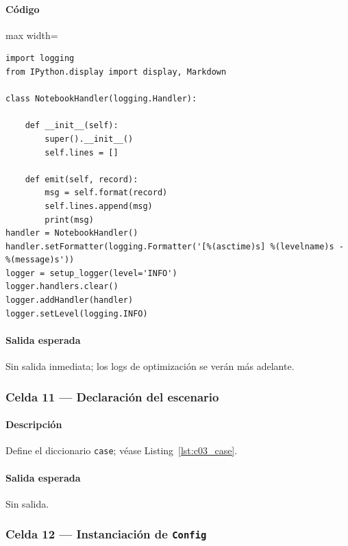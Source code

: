 \paragraph{Código}
\par\smallskip
\begin{listing}[H]
\caption{Celda 9: configuración de logs interactivos}
\begin{adjustbox}{max width=\textwidth}
\begin{minipage}{\textwidth}
\begin{verbatim}
import logging
from IPython.display import display, Markdown

class NotebookHandler(logging.Handler):

    def __init__(self):
        super().__init__()
        self.lines = []

    def emit(self, record):
        msg = self.format(record)
        self.lines.append(msg)
        print(msg)
handler = NotebookHandler()
handler.setFormatter(logging.Formatter('[%(asctime)s] %(levelname)s - %(message)s'))
logger = setup_logger(level='INFO')
logger.handlers.clear()
logger.addHandler(handler)
logger.setLevel(logging.INFO)
\end{verbatim}
\end{minipage}
\end{adjustbox}
\end{listing}
\paragraph{Salida esperada} Sin salida inmediata; los logs de optimización se verán más adelante.

\subsubsection*{Celda 11 — Declaración del escenario}
\paragraph{Descripción} Define el diccionario \texttt{case}; véase Listing~\ref{lst:c03_case}.
\paragraph{Salida esperada} Sin salida.

\subsubsection*{Celda 12 — Instanciación de \texttt{Config}}

